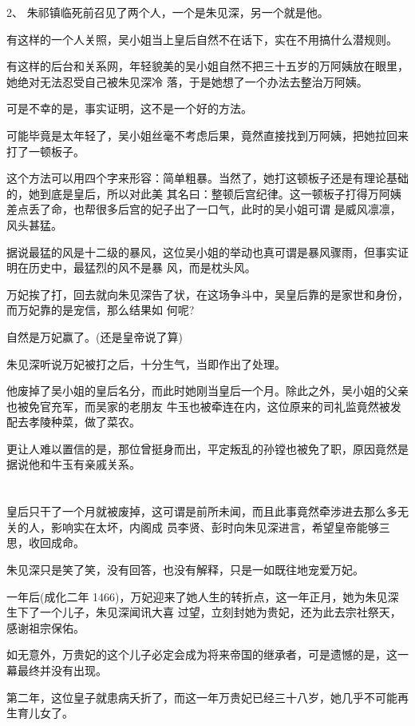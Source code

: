 \documentclass[11pt,a4paper,onecolumn]{article}
\begin{document}
2、 朱祁镇临死前召见了两个人，一个是朱见深，另一个就是他。

有这样的一个人关照，吴小姐当上皇后自然不在话下，实在不用搞什么潜规则。

有这样的后台和关系网，年轻貌美的吴小姐自然不把三十五岁的万阿姨放在眼里，她绝对无法忍受自己被朱见深冷
落，于是她想了一个办法去整治万阿姨。

可是不幸的是，事实证明，这不是一个好的方法。

可能毕竟是太年轻了，吴小姐丝毫不考虑后果，竟然直接找到万阿姨，把她拉回来打了一顿板子。

这个方法可以用四个字来形容：简单粗暴。当然了，她打这顿板子还是有理论基础的，她到底是皇后，所以对此美
其名曰：整顿后宫纪律。这一顿板子打得万阿姨差点丢了命，也帮很多后宫的妃子出了一口气，此时的吴小姐可谓
是威风凛凛，风头甚猛。

据说最猛的风是十二级的暴风，这位吴小姐的举动也真可谓是暴风骤雨，但事实证明在历史中，最猛烈的风不是暴
风，而是枕头风。

万妃挨了打，回去就向朱见深告了状，在这场争斗中，吴皇后靠的是家世和身份，而万妃靠的是宠信，那么结果如
何呢?

自然是万妃赢了。(还是皇帝说了算)

朱见深听说万妃被打之后，十分生气，当即作出了处理。

他废掉了吴小姐的皇后名分，而此时她刚当皇后一个月。除此之外，吴小姐的父亲也被免官充军，而吴家的老朋友
牛玉也被牵连在内，这位原来的司礼监竟然被发配去孝陵种菜，做了菜农。

更让人难以置信的是，那位曾挺身而出，平定叛乱的孙镗也被免了职，原因竟然是据说他和牛玉有亲戚关系。

\section[\thesection]{}

皇后只干了一个月就被废掉，这可谓是前所未闻，而且此事竟然牵涉进去那么多无关的人，影响实在太坏，内阁成
员李贤、彭时向朱见深进言，希望皇帝能够三思，收回成命。

朱见深只是笑了笑，没有回答，也没有解释，只是一如既往地宠爱万妃。

一年后(成化二年 1466)，万妃迎来了她人生的转折点，这一年正月，她为朱见深生下了一个儿子，朱见深闻讯大喜
过望，立刻封她为贵妃，还为此去宗社祭天，感谢祖宗保佑。

如无意外，万贵妃的这个儿子必定会成为将来帝国的继承者，可是遗憾的是，这一幕最终并没有出现。

第二年，这位皇子就患病夭折了，而这一年万贵妃已经三十八岁，她几乎不可能再生育儿女了。
\end{document}
